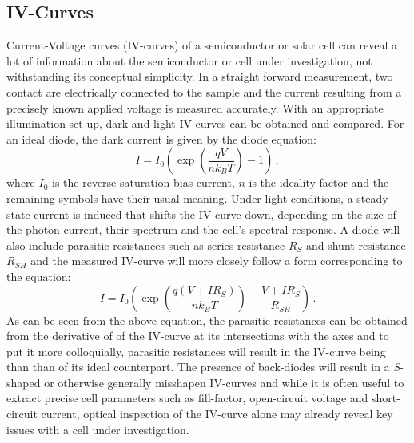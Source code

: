 \subsection{IV-Curves}
Current-Voltage curves (IV-curves) of a semiconductor or solar cell can reveal a lot of information about the semiconductor or cell under investigation, not withstanding its conceptual simplicity. In a straight forward measurement, two contact are electrically connected to the sample and the current resulting from a precisely known applied voltage is measured accurately. With an appropriate illumination set-up, dark and light IV-curves can be obtained and compared. For an ideal diode, the dark current is given by the diode equation:
\begin{equation}
	I = I_0 \left( \exp \left( \frac{qV}{nk_BT} \right) -1 \right) \, ,
\end{equation}
where $I_0$ is the reverse saturation bias current, $n$ is the ideality factor and the remaining symbols have their usual meaning. Under light conditions, a steady-state current is induced that shifts the IV-curve down, depending on the size of the photon-current, their spectrum and the cell's spectral response. A  diode will also include parasitic resistances such as series resistance $R_S$ and shunt resistance $R_{SH}$ and the measured IV-curve will more closely follow a form corresponding to the equation:
\begin{equation}
	I = I_0 \left( \exp \left( \frac{q(V+IR_S)}{nk_BT} \right) -\frac{V+IR_S}{R_{SH}} \right) \, .
\end{equation}
As can be seen from the above equation, the parasitic resistances can be obtained from the derivative of of the IV-curve at its intersections with the axes and to put it more colloquially, parasitic resistances will result in the IV-curve being  than than of its ideal counterpart. The presence of back-diodes will result in a \emph{S}-shaped or otherwise generally misshapen IV-curves and while it is often useful to extract precise cell parameters such as fill-factor, open-circuit voltage and short-circuit current, optical inspection of the IV-curve alone may already reveal key issues with a cell under investigation.
